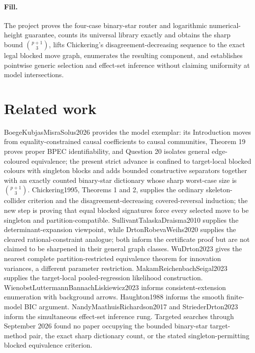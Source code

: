 \documentclass{article}
\begin{document}
\paragraph{Fill.} The project proves the four-case binary-star router and logarithmic numerical-height guarantee, counts its universal library exactly and obtains the sharp bound \(\binom{p+1}{3}\), lifts Chickering's disagreement-decreasing sequence to the exact legal blocked move graph, enumerates the resulting component, and establishes pointwise generic selection and effect-set inference without claiming uniformity at model intersections.

\section{Related work}

BoegeKubjasMisraSolus2026 provides the model exemplar: its Introduction moves from equality-constrained causal coefficients to causal communities, Theorem 19 proves proper BPEC identifiability, and Question 20 isolates general edge-coloured equivalence; the present strict advance is confined to target-local blocked colours with singleton blocks and adds bounded constructive separators together with an exactly counted binary-star dictionary whose sharp worst-case size is \(\binom{p+1}{3}\). Chickering1995, Theorems 1 and 2, supplies the ordinary skeleton-collider criterion and the disagreement-decreasing covered-reversal induction; the new step is proving that equal blocked signatures force every selected move to be singleton and partition-compatible. SullivantTalaskaDraisma2010 supplies the determinant-expansion viewpoint, while DrtonRobevaWeihs2020 supplies the cleared rational-constraint analogue; both inform the certificate proof but are not claimed to be sharpened in their general graph classes. WuDrton2023 gives the nearest complete partition-restricted equivalence theorem for innovation variances, a different parameter restriction. MakamReichenbachSeigal2023 supplies the target-local pooled-regression likelihood construction. WienobstLuttermannBannachLiskiewicz2023 informs consistent-extension enumeration with background arrows. Haughton1988 informs the smooth finite-model BIC argument. NandyMaathuisRichardson2017 and StriederDrton2023 inform the simultaneous effect-set inference rung. Targeted searches through September 2026 found no paper occupying the bounded binary-star target-method pair, the exact sharp dictionary count, or the stated singleton-permitting blocked equivalence criterion.
\end{document}
